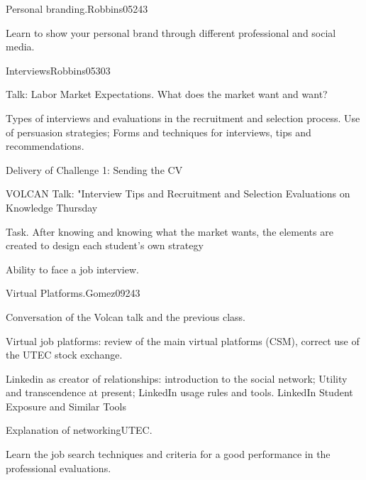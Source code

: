 \begin{syllabus}
\begin{unit}{Personal branding.}{}{Robbins05}{24}{3}
   \begin{learningoutcomes}
      \item Learn to show your personal brand through different professional and social media.
   \end{learningoutcomes}
\end{unit}

\begin{unit}{Interviews}{}{Robbins05}{30}{3}
   \begin{topics}
      \item Talk: Labor Market Expectations. What does the market want and want?
      \item Types of interviews and evaluations in the recruitment and selection process. Use of persuasion strategies; Forms and techniques for interviews, tips and recommendations.
      \item Delivery of Challenge 1: Sending the CV
      \item VOLCAN Talk: "Interview Tips and Recruitment and Selection Evaluations on Knowledge Thursday
      \item Task. After knowing and knowing what the market wants, the elements are created to design each student's own strategy
   \end{topics}

   \begin{learningoutcomes}
      \item Ability to face a job interview.
   \end{learningoutcomes}
\end{unit}

\begin{unit}{Virtual Platforms.}{}{Gomez09}{24}{3}
   \begin{topics}
      \item Conversation of the Volcan talk and the previous class.
      \item Virtual job platforms: review of the main virtual platforms (CSM), correct use of the UTEC stock exchange.
      \item Linkedin as creator of relationships: introduction to the social network; Utility and transcendence at present; LinkedIn usage rules and tools. LinkedIn Student Exposure and Similar Tools
      \item Explanation of networkingUTEC.   
   \end{topics}

   \begin{learningoutcomes}
      \item Learn the job search techniques and criteria for a good performance in the professional evaluations.
   \end{learningoutcomes}
\end{unit}


\end{syllabus}
